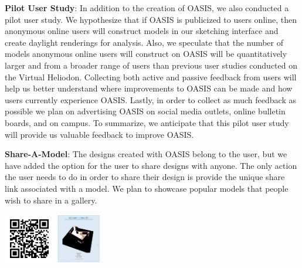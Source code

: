 \documentclass[landscape,final,a0paper,fontscale=0.285]{baposter}
\begin{document}
\begin{poster}
{\begin{multicols}{2}
	
	\textbf{Pilot User Study}: In addition to the creation of OASIS, we also conducted a pilot user study. 
	We hypothesize that if OASIS is publicized to users online, then anonymous online users will construct models in our sketching interface and create daylight renderings for analysis.
	Also, we speculate that the number of models anonymous online users will construct on OASIS will be quantitatively larger and from a broader range of users than previous user studies conducted on the Virtual Heliodon.
	Collecting both active and passive feedback from users will help us better understand where improvements to OASIS can be made and how users currently experience OASIS.
	Lastly, in order to collect as much feedback as possible we plan on advertising OASIS on social media outlets, online bulletin boards, and on campus.
	To summarize, we anticipate  that this pilot user study will provide us valuable feedback to improve OASIS.
	

	 
	\textbf{Share-A-Model}:  The designs created with OASIS belong to the user, but we have added the option for the user to share designs with anyone. The only action the user needs to do in order to share their design is provide the unique share link associated with a model. We plan to showcase popular models that people wish to share in a gallery. 
	
	
	\begin{center}\includegraphics[height=6em]{img/videoqr.jpg}	
	\includegraphics[height=6em]{img/nab.png}	
	\end{center}	
	
	
	
	   
 \end{multicols}
}


\end{poster}
\end{document}
